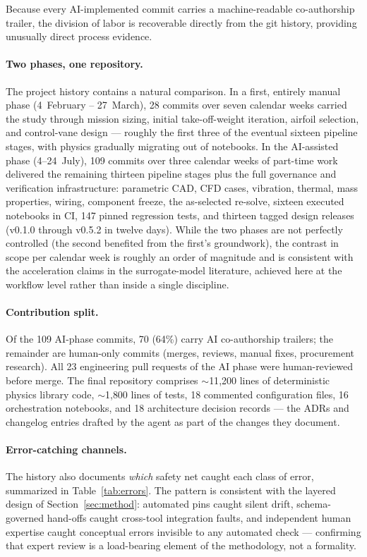 Because every AI-implemented commit carries a machine-readable
co-authorship trailer, the division of labor is recoverable directly
from the git history, providing unusually direct process evidence.

\paragraph{Two phases, one repository.} The project history contains a
natural comparison. In a first, entirely manual phase (4~February --
27~March), 28 commits over seven calendar weeks carried the study
through mission sizing, initial take-off-weight iteration, airfoil
selection, and control-vane design --- roughly the first three of the
eventual sixteen pipeline stages, with physics gradually migrating out
of notebooks. In the AI-assisted phase (4--24~July), 109 commits over
three calendar weeks of part-time work delivered the remaining
thirteen pipeline stages plus the full governance and verification
infrastructure: parametric CAD, CFD cases, vibration, thermal, mass
properties, wiring, component freeze, the as-selected re-solve,
sixteen executed notebooks in CI, 147 pinned regression tests, and
thirteen tagged design releases (v0.1.0 through v0.5.2 in twelve
days). While the two phases are not perfectly controlled (the second
benefited from the first's groundwork), the contrast in scope per
calendar week is roughly an order of magnitude and is consistent with
the acceleration claims in the surrogate-model literature, achieved
here at the workflow level rather than inside a single discipline.

\paragraph{Contribution split.} Of the 109 AI-phase commits, 70
(64\%) carry AI co-authorship trailers; the remainder are human-only
commits (merges, reviews, manual fixes, procurement research). All 23
engineering pull requests of the AI phase were human-reviewed before
merge. The final repository comprises $\sim$11{,}200 lines of
deterministic physics library code, $\sim$1{,}800 lines of tests, 18
commented configuration files, 16 orchestration notebooks, and 18
architecture decision records --- the ADRs and changelog entries
drafted by the agent as part of the changes they document.

\paragraph{Error-catching channels.} The history also documents
\emph{which} safety net caught each class of error, summarized in
Table~\ref{tab:errors}. The pattern is consistent with the layered
design of Section~\ref{sec:method}: automated pins caught silent
drift, schema-governed hand-offs caught cross-tool integration faults,
and independent human expertise caught conceptual errors invisible to
any automated check --- confirming that expert review is a
load-bearing element of the methodology, not a formality.

